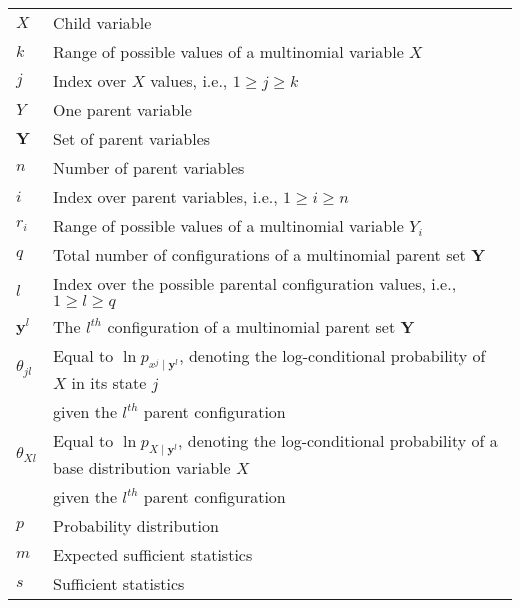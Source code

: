 \documentclass[11pt, oneside]{article}   	%
\numberwithin{figure}{section}
\numberwithin{equation}{section}
\numberwithin{table}{section}
\begin{document}
\begin{table}[ht!]
\renewcommand{\arraystretch}{1.1}
{\small
\begin{tabular}{l l}
$X$ & Child variable\\
$k$& Range of possible values of a multinomial variable $X$\\
$j$ & Index over $X$ values, i.e., $1 \geq j \geq k$ \\
$Y$ & One parent variable\\
$\mathbf{Y}$ & Set of parent variables\\
$n$& Number of parent variables \\
$i$ & Index over parent variables, i.e., $1 \geq i \geq n$ \\
$r_i$& Range of possible values of a multinomial variable $Y_i$\\
$q $ & Total number of configurations of a multinomial parent set $\mathbf{Y}$\\
$l$ & Index over the possible parental configuration values, i.e., $1 \geq l \geq q$ \\
$\mathbf{y}^l$ & The $l^{th}$ configuration of a multinomial parent set $\mathbf{Y}$\\
$\theta_{jl}$ & Equal to $\ln p_{x^j\mid \mathbf{y}^l}$, denoting the log-conditional probability of $X$ in its state $j$ \\
                    & given the $l^{th}$ parent configuration\\
$\theta_{Xl}$ & Equal to $\ln p_{ X \mid \mathbf{y}^l}$, denoting the log-conditional probability of a base distribution variable $X$ \\
                    & given the $l^{th}$ parent configuration\\
$p$ & Probability distribution\\
$m$ & Expected sufficient statistics \\
$s$ & Sufficient statistics \\
\end{tabular}}
\end{table}
\end{document}
